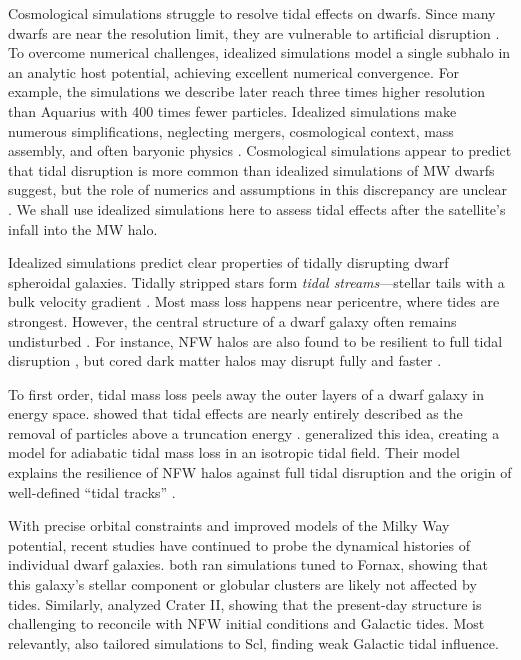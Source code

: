 Cosmological simulations struggle to resolve tidal effects on dwarfs.
Since many dwarfs are near the resolution limit, they are vulnerable to
artificial disruption
\citep[e.g.,][]{vandenbosch+2018, santos-santos+2025}. To overcome
numerical challenges, idealized simulations model a single subhalo in an
analytic host potential, achieving excellent numerical convergence. For
example, the simulations we describe later reach three times higher
resolution than Aquarius \citep{springel+2008} with 400 times fewer
particles. Idealized simulations make numerous simplifications,
neglecting mergers, cosmological context, mass assembly, and often
baryonic physics
\citep[e.g.,][]{hayashi+2003, bullock+johnston2005, klimentowski+2009, ogiya+2019}.
Cosmological simulations appear to predict that tidal disruption is more
common than idealized simulations of MW dwarfs suggest, but the role of
numerics and assumptions in this discrepancy are unclear
\citep{panithanpaisal+2021, shipp+2023, riley+2024}. We shall use
idealized simulations here to assess tidal effects after the satellite's
infall into the MW halo.

Idealized simulations predict clear properties of tidally disrupting
dwarf spheroidal galaxies. Tidally stripped stars form \emph{tidal
streams}---stellar tails with a bulk velocity gradient
\citep[e.g.,][]{moore+davis1994, johnston+spergel+hernquist1995, read+2006}.
Most mass loss happens near pericentre, where tides are strongest.
However, the central structure of a dwarf galaxy often remains
undisturbed \citep{oh+lin+aarseth1995, piatek+pryor1995}. For instance,
NFW halos are also found to be resilient to full tidal disruption
\citep{EP2020}, but cored dark matter halos may disrupt fully and faster
\citep[e.g.,][]{penarrubia+2010, errani+2023a}.

To first order, tidal mass loss peels away the outer layers of a dwarf
galaxy in energy space.
\citet{drakos+taylor+benson2020, drakos+taylor+benson2022, amorisco2021}
showed that tidal effects are nearly entirely described as the removal
of particles above a truncation energy \citep[see
also][]{choi+weinberg+katz2009}. \citet{stucker+2023} generalized this
idea, creating a model for adiabatic tidal mass loss in an isotropic
tidal field. Their model explains the resilience of NFW halos against
full tidal disruption and the origin of well-defined ``tidal tracks''
\citep[as observed in][]{PNM2008, green+vandenbosch2019, EN2021}.

With precise orbital constraints and improved models of the Milky Way
potential, recent studies have continued to probe the dynamical
histories of individual dwarf galaxies.
\citet{battaglia+sollima+nipoti2015, borukhovetskaya+2022, dicintio+2024}
both ran simulations tuned to Fornax, showing that this galaxy's stellar
component or globular clusters are likely not affected by tides.
Similarly, \citet{borukhovetskaya+2022a} analyzed Crater II, showing
that the present-day structure is challenging to reconcile with NFW
initial conditions and Galactic tides. Most relevantly,
\citet{iorio+2019} also tailored simulations to Scl, finding weak
Galactic tidal influence.

